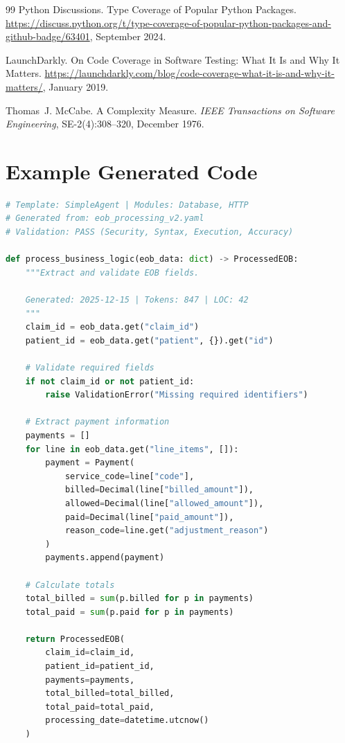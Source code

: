 \documentclass[11pt]{article}
\begin{document}
\begin{thebibliography}{99}
Python Discussions.
\newblock Type Coverage of Popular Python Packages.
\newblock \url{https://discuss.python.org/t/type-coverage-of-popular-python-packages-and-github-badge/63401}, September 2024.

LaunchDarkly.
\newblock On Code Coverage in Software Testing: What It Is and Why It Matters.
\newblock \url{https://launchdarkly.com/blog/code-coverage-what-it-is-and-why-it-matters/}, January 2019.

Thomas~J. McCabe.
\newblock A Complexity Measure.
\newblock \emph{IEEE Transactions on Software Engineering}, SE-2(4):308--320, December 1976.

\end{thebibliography}


\appendix

\section{Example Generated Code}
\label{app:example}

\begin{lstlisting}[language=Python, caption={Generated Temporal activity (business logic only)}, basicstyle=\small\ttfamily]
# Template: SimpleAgent | Modules: Database, HTTP
# Generated from: eob_processing_v2.yaml
# Validation: PASS (Security, Syntax, Execution, Accuracy)

def process_business_logic(eob_data: dict) -> ProcessedEOB:
    """Extract and validate EOB fields.
    
    Generated: 2025-12-15 | Tokens: 847 | LOC: 42
    """
    claim_id = eob_data.get("claim_id")
    patient_id = eob_data.get("patient", {}).get("id")
    
    # Validate required fields
    if not claim_id or not patient_id:
        raise ValidationError("Missing required identifiers")
    
    # Extract payment information
    payments = []
    for line in eob_data.get("line_items", []):
        payment = Payment(
            service_code=line["code"],
            billed=Decimal(line["billed_amount"]),
            allowed=Decimal(line["allowed_amount"]),
            paid=Decimal(line["paid_amount"]),
            reason_code=line.get("adjustment_reason")
        )
        payments.append(payment)
    
    # Calculate totals
    total_billed = sum(p.billed for p in payments)
    total_paid = sum(p.paid for p in payments)
    
    return ProcessedEOB(
        claim_id=claim_id,
        patient_id=patient_id,
        payments=payments,
        total_billed=total_billed,
        total_paid=total_paid,
        processing_date=datetime.utcnow()
    )
\end{lstlisting}
\end{document}
